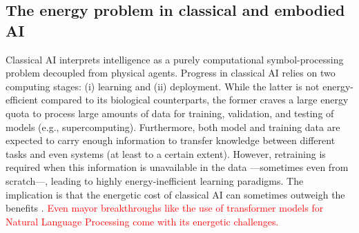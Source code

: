 \subsection{The energy problem in classical and embodied AI}
Classical AI interprets intelligence as a purely computational symbol-processing problem decoupled from physical agents. Progress in classical AI relies on two computing stages: (i) learning and (ii) deployment. While the latter is not energy-efficient compared to its biological counterparts, the former craves a large energy quota to process large amounts of data for training, validation, and testing of models (e.g., supercomputing). Furthermore, both model and training data are expected to carry enough information to transfer knowledge between different tasks and even systems (at least to a certain extent). However, retraining is required when this information is unavailable in the data ---sometimes even from scratch---, leading to highly energy-inefficient learning paradigms. The implication is that the energetic cost of classical AI can sometimes outweigh the benefits \cite{Strubell2019EnergyAP}. \textcolor{red}{Even mayor breakthroughs like the use of transformer models for Natural Language Processing come with its energetic challenges\cite{Cao2020TowardsAccurateReliable}.}

